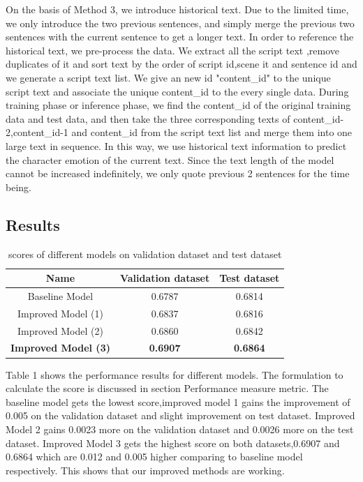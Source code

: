 \documentclass[12pt,twocolumn,letterpaper]{article}
\begin{document}
On the basis of Method 3, we introduce historical text. Due to the limited time, we only introduce the two previous sentences, and simply merge the previous two sentences with the current sentence to get a longer text. In order to reference the historical text, we pre-process the data. We extract all the script text ,remove duplicates of it and sort text by the order of script id,scene it and sentence id and we generate a script text list. We give an new id "content\_id" to the unique script text and associate the unique content\_id to the every single data. During training phase or inference phase, we find the content\_id of the original training data and test data, and then take the three corresponding texts of content\_id-2,content\_id-1 and content\_id from the script text list and merge them into one large text in sequence. 
In this way, we use historical text information to predict the character emotion of the current text. Since the text length of the model cannot be increased indefinitely, we only quote previous 2 sentences for the time being. 



\subsection{Results}

\begin{table}
\begin{center}
\begin{tabular}{|c|c|c|}
\hline
Name & Validation dataset  & Test dataset\\
\hline 
Baseline Model & 0.6787 & 0.6814\\
\hline 
Improved Model (1) & 0.6837 & 0.6816\\
\hline 
Improved Model (2) & 0.6860 & 0.6842\\
\hline 
\bf Improved Model (3) & \bf 0.6907 & \bf 0.6864\\
\hline 
\end{tabular}
\end{center}
\caption{scores of different models on validation dataset and test dataset}
\end{table}
Table 1 shows the performance results for different models. The formulation to calculate the score is discussed in section Performance measure metric. The baseline model gets the lowest score,improved model 1 gains the improvement of  0.005 on the validation dataset and slight improvement on test dataset. Improved Model 2 gains 0.0023 more on the validation dataset and 0.0026 more on the test dataset. Improved Model 3 gets the highest score on both datasets,0.6907 and 0.6864 which are 0.012 and 0.005 higher comparing to baseline model respectively. This shows that our improved methods are working. 
\end{document}
